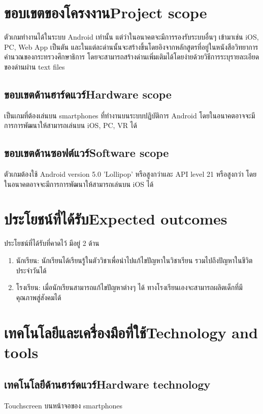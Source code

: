 \section{\ifcpe ขอบเขตของโครงงาน\else Project scope\fi}
ตัวเกมทำงานได้ในระบบ Android เท่านั้น แต่ว่าในอนาคตจะมีการรองรับระบบอื่นๆ 
เข้ามาเช่น iOS, PC, Web App เป็นตัน 
และในแต่ละด่านนั้นจะสร้างขึ้นโดยอิงจากหลักสูตรที่อยู่ในหนังสือวิทยาการคำนวณของกระทรวงศึกษาธิการ
โดยจะสามารถสร้างด่านเพิ่มเติมได้โดยง่ายด้วยวิธีการระบุรายละเอียดของด่านผ่าน text files

\subsection{\ifcpe ขอบเขตด้านฮาร์ดแวร์\else Hardware scope\fi}
เป็นเกมที่ต้องเล่นบน smartphones ที่ทำงานบนระบบปฏิบัติการ Android โดยในอนาคตอาจจะมีการการพัฒนาให้สามารถเล่นบน iOS, PC, VR ได้

\subsection{\ifcpe ขอบเขตด้านซอฟต์แวร์\else Software scope\fi}
ตัวเกมต้องใช้ Android version 5.0 'Lollipop' หรือสูงกว่าและ API level 21 หรือสูงกว่า
โดยในอนาคตอาจจะมีการการพัฒนาให้สามารถเล่นบน iOS ได้

\section{\ifcpe ประโยชน์ที่ได้รับ\else Expected outcomes\fi}
ประโยชน์ที่ได้รับที่คาดไว้ มีอยู่ 2 ด้าน 
\begin{enumerate}
    \item นักเรียน: นักเรียนได้เรียนรู้ในตัววิชาเพื่อนำไปแก้ไขปัญหาในวิชาเรียน รวมไปถึงปัญหาในชีวิตประจำวันได้
    \item โรงเรียน: เมื่อนักเรียนสามารถแก้ไขปัญหาต่างๆ ได้ ทางโรงเรียนเองจะสามารถผลิตเด็กที่มีคุณภาพสู่สังคมได้ 
\end{enumerate}

\section{\ifcpe เทคโนโลยีและเครื่องมือที่ใช้\else Technology and tools\fi}

\subsection{\ifcpe เทคโนโลยีด้านฮาร์ดแวร์\else Hardware technology\fi}
Touchscreen บนหน้าจอของ smartphones

